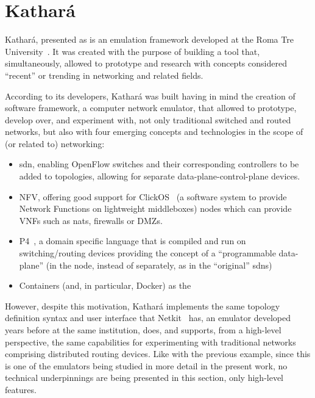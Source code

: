 \section{Kathará}
\label{sec:exemulkathara}

Kathará, presented as  is an emulation framework developed at the Roma Tre University~\cite{kathara}.
It was created with the purpose of building a tool that, simultaneously, allowed to prototype and research with concepts considered ``recent'' or trending in networking and related fields.

According to its developers, Kathará was built having in mind the creation of software framework, a computer network emulator, that allowed to prototype, develop over, and experiment with, not only traditional switched and routed networks, but also with four emerging concepts and technologies in the scope of (or related to) networking:
\begin{itemize}
	\item \gls{sdn}, enabling OpenFlow switches and their corresponding controllers to be added to topologies, allowing for separate data-plane-control-plane devices.
	\item NFV, offering good support for ClickOS~\cite{clickos} (a software system to provide Network Functions on lightweight middleboxes) nodes which can provide VNFs such as \glspl{nat}, firewalls or DMZs.
	\item P4~\cite{p4programming}, a domain specific language that is compiled and run on switching/routing devices providing the concept of a ``programmable data-plane'' (in the node, instead of separately, as in the ``original'' \glspl{sdn})
	\item Containers (and, in particular, Docker) as the 
\end{itemize}

However, despite this motivation, Kathará implements the same topology definition syntax and user interface that Netkit~\cite{netkit-short} has, an emulator developed years before at the same institution, does, and supports, from a high-level perspective, the same capabilities for experimenting with traditional networks comprising distributed routing devices.
Like with the previous example, since this is one of the emulators being studied in more detail in the present work, no technical underpinnings are being presented in this section, only high-level features.

